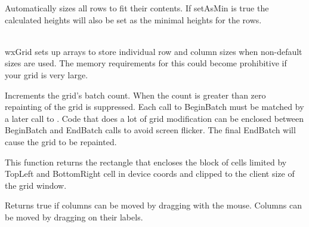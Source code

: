 \label{wxgridautosizerows}


Automatically sizes all rows to fit their contents. If setAsMin is true the calculated heights will
also be set as the minimal heights for the rows.

\\
wxGrid sets up arrays to store individual row and column sizes when non-default sizes are used.
The memory requirements for this could become prohibitive if your grid is very large.



\label{wxgridbeginbatch}


Increments the grid's batch count. When the count is greater than zero repainting of
the grid is suppressed. Each call to BeginBatch must be matched by a later call to
. Code that does a lot of grid
modification can be enclosed between BeginBatch and EndBatch calls to avoid
screen flicker. The final EndBatch will cause the grid to be repainted.





\label{wxgridblocktodevicerect}


This function returns the rectangle that encloses the block of cells
limited by TopLeft and BottomRight cell in device coords and clipped
to the client size of the grid window.



\label{wxgridcandragcolmove}


Returns true if columns can be moved by dragging with the mouse. Columns can be moved
by dragging on their labels.



\label{wxgridcandragcolsize}


